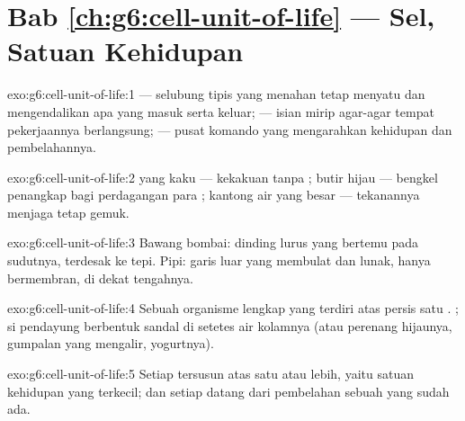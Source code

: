 \section*{Bab \ref{ch:g6:cell-unit-of-life} --- Sel, Satuan Kehidupan}

\begin{solution}{exo:g6:cell-unit-of-life:1}
 --- selubung tipis yang menahan  tetap menyatu dan
mengendalikan apa yang masuk serta keluar;  --- isian mirip
agar-agar tempat pekerjaannya berlangsung;  --- pusat komando
yang mengarahkan kehidupan  dan pembelahannya.
\end{solution}

\begin{solution}{exo:g6:cell-unit-of-life:2}
 yang kaku --- kekakuan  tanpa ; butir hijau
--- bengkel penangkap  bagi perdagangan para ; kantong
air yang besar --- tekanannya menjaga  tetap gemuk.
\end{solution}

\begin{solution}{exo:g6:cell-unit-of-life:3}
Bawang bombai: dinding lurus yang bertemu pada sudutnya, 
terdesak ke tepi. Pipi: garis luar yang membulat dan lunak, hanya
bermembran,  di dekat tengahnya.
\end{solution}

\begin{solution}{exo:g6:cell-unit-of-life:4}
Sebuah organisme lengkap yang terdiri atas persis satu . ;
si pendayung berbentuk sandal di setetes air kolamnya (atau perenang
hijaunya, gumpalan yang mengalir,  yogurtnya).
\end{solution}

\begin{solution}{exo:g6:cell-unit-of-life:5}
Setiap  tersusun atas satu  atau lebih, yaitu satuan
kehidupan yang terkecil; dan setiap  datang dari pembelahan sebuah
 yang sudah ada.
\end{solution}

